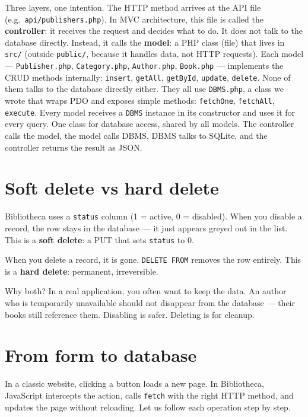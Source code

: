 \documentclass[11pt,a4paper,oneside]{book}
\begin{document}
Three layers, one intention. The HTTP method arrives at the API
file (e.g.~\texttt{api/publishers.php}). In MVC architecture,
this file is called the \textbf{controller}: it receives the
request and decides what to do. It does not talk to the database
directly. Instead, it calls the \textbf{model}: a PHP class
(file) that lives in \texttt{src/} (outside \texttt{public/},
because it handles data, not HTTP requests). Each model ---
\texttt{Publisher.php}, \texttt{Category.php},
\texttt{Author.php}, \texttt{Book.php} --- implements the CRUD
methods internally: \texttt{insert}, \texttt{getAll},
\texttt{getById}, \texttt{update}, \texttt{delete}. None of them
talks to the database directly either. They all use
\texttt{DBMS.php}, a class we wrote that wraps PDO and exposes
simple methods: \texttt{fetchOne}, \texttt{fetchAll},
\texttt{execute}. Every model receives a \texttt{DBMS} instance
in its constructor and uses it for every query. One class for
database access, shared by all models. The controller calls the
model, the model calls DBMS, DBMS talks to SQLite, and the
controller returns the result as JSON.

\hypertarget{soft-delete-vs-hard-delete}{%
\section{Soft delete vs hard
delete}\label{soft-delete-vs-hard-delete}}

Bibliotheca uses a \texttt{status} column (1 = active, 0 =
disabled). When you disable a record, the row stays in the
database --- it just appears greyed out in the list. This is a
\textbf{soft delete}: a PUT that sets \texttt{status} to 0.

When you delete a record, it is gone. \texttt{DELETE\ FROM}
removes the row entirely. This is a \textbf{hard delete}:
permanent, irreversible.

Why both? In a real application, you often want to keep the data.
An author who is temporarily unavailable should not disappear
from the database --- their books still reference them. Disabling
is safer. Deleting is for cleanup.

\hypertarget{from-form-to-database}{%
\section{From form to database}\label{from-form-to-database}}

In a classic website, clicking a button loads a new page. In
Bibliotheca, JavaScript intercepts the action, calls
\texttt{fetch} with the right HTTP method, and updates the page
without reloading. Let us follow each operation step by step.
\end{document}
